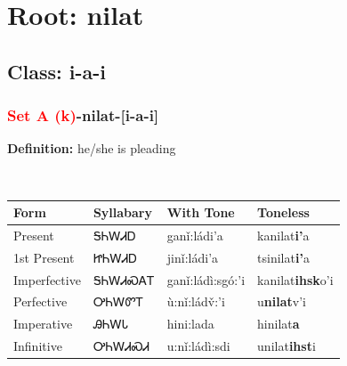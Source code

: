 \needspace{4in}
\section*{Root: nilat}
\nopagebreak
{}
\needspace{3in}
\subsection*{Class: i-a-i}
\nopagebreak
\needspace{2in}
\subsubsection*{\textcolor{Red}{Set A (k)}{-}\textbf{nilat}{-}[i-a-i]}
\nopagebreak
\textbf{Definition: } he/she is pleading
\\[0.5em]
\begin{tabularx}{\textwidth}{l X X X}%
\toprule%
\textbf{Form}&\textbf{Syllabary}&\textbf{With Tone}&\textbf{Toneless}\\%
\midrule%
Present&ᎦᏂᎳᏗᎠ&ganǐ:ládi’a&kanilat\textbf{i'}a\\%
1st Present&ᏥᏂᎳᏗᎠ&jinǐ:ládi’a&tsinilat\textbf{i'}a\\%
Imperfective&ᎦᏂᎳᏗᏍᎪᎢ&ganǐ:ládì:sgó:’i&kanilat\textbf{ihsk}o'i\\%
Perfective&ᎤᏂᎳᏛᎢ&ù:nǐ:ládv̌:’i&u\textbf{nilat}v'i\\%
Imperative&ᎯᏂᎳᏓ&hini:lada&hinilat\textbf{a}\\%
Infinitive&ᎤᏂᎳᏗᏍᏗ&u:nǐ:ládì:sdi&unilat\textbf{ihst}i\\%
\bottomrule%
\end{tabularx}
\\[1em]